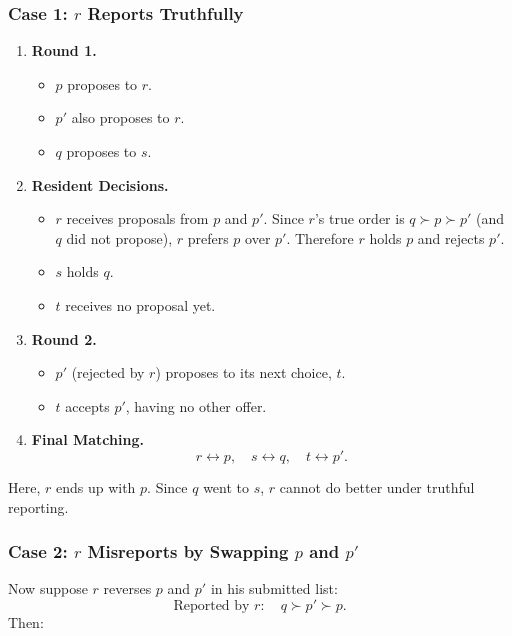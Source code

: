 \documentclass[12pt]{article}
\begin{document}
\subsubsection*{Case 1: $r$ Reports Truthfully}
\begin{enumerate}
    \item \textbf{Round 1.} 
    \begin{itemize}
        \item \(p\) proposes to \(r\). 
        \item \(p'\) also proposes to \(r\). 
        \item \(q\) proposes to \(s\).
    \end{itemize}
    \item \textbf{Resident Decisions.}
    \begin{itemize}
        \item \(r\) receives proposals from \(p\) and \(p'\). 
              Since \(r\)'s true order is \(q \succ p \succ p'\) (and \(q\) did not propose), \(r\) prefers \(p\) over \(p'\). 
              Therefore \(r\) holds \(p\) and rejects \(p'\).
        \item \(s\) holds \(q\). 
        \item \(t\) receives no proposal yet.
    \end{itemize}
    \item \textbf{Round 2.}
    \begin{itemize}
        \item \(p'\) (rejected by \(r\)) proposes to its next choice, \(t\). 
        \item \(t\) accepts \(p'\), having no other offer.
    \end{itemize}
    \item \textbf{Final Matching.}
    \[
    r \leftrightarrow p, \quad s \leftrightarrow q, \quad t \leftrightarrow p'.
    \]
\end{enumerate}

Here, \(r\) ends up with \(p\). Since \(q\) went to \(s\), \(r\) cannot do better under truthful reporting.

\subsubsection*{Case 2: $r$ Misreports by Swapping $p$ and $p'$}
Now suppose \(r\) reverses \(p\) and \(p'\) in his submitted list:
\[
\text{Reported by }r:\quad q \succ p' \succ p.
\]
Then:
\end{document}
